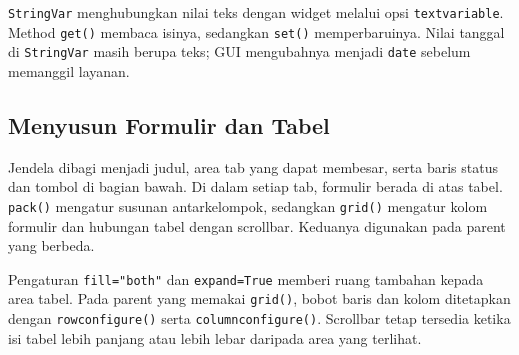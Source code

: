 \texttt{StringVar} menghubungkan nilai teks dengan widget melalui opsi \texttt{textvariable}. Method \texttt{get()} membaca isinya, sedangkan \texttt{set()} memperbaruinya. Nilai tanggal di \texttt{StringVar} masih berupa teks; GUI mengubahnya menjadi \texttt{date} sebelum memanggil layanan.

\subsection{Menyusun Formulir dan Tabel}

Jendela dibagi menjadi judul, area tab yang dapat membesar, serta baris status dan tombol di bagian bawah. Di dalam setiap tab, formulir berada di atas tabel. \texttt{pack()} mengatur susunan antarkelompok, sedangkan \texttt{grid()} mengatur kolom formulir dan hubungan tabel dengan scrollbar. Keduanya digunakan pada parent yang berbeda.

Pengaturan \texttt{fill="both"} dan \texttt{expand=True} memberi ruang tambahan kepada area tabel. Pada parent yang memakai \texttt{grid()}, bobot baris dan kolom ditetapkan dengan \texttt{rowconfigure()} serta \texttt{columnconfigure()}. Scrollbar tetap tersedia ketika isi tabel lebih panjang atau lebih lebar daripada area yang terlihat.

